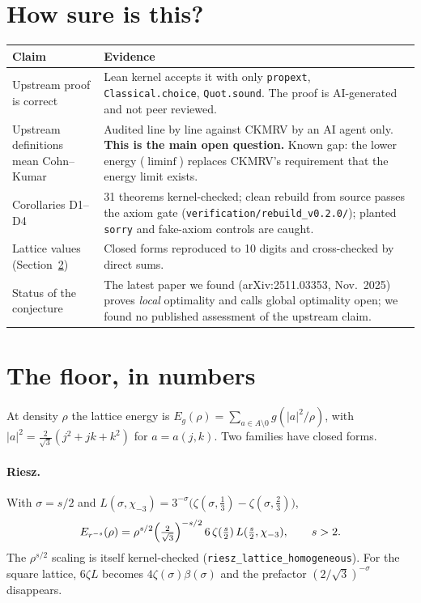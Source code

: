 \documentclass[11pt,a4paper]{article}
\newcommand{\code}[1]{\texttt{#1}}
\begin{document}
\section{How sure is this?}\label{sec:status}

\begin{center}\small
\begin{tabular}{@{}p{5.2cm}p{9.2cm}@{}}
\toprule
Claim & Evidence \\
\midrule
Upstream proof is correct & Lean kernel accepts it with only \code{propext}, \code{Classical.choice}, \code{Quot.sound}.
The proof is AI-generated and not peer reviewed. \\
Upstream definitions mean Cohn--Kumar & Audited line by line against CKMRV by an AI agent only. \textbf{This is the main open
question.} Known gap: the lower energy ($\liminf$) replaces CKMRV's requirement that the energy limit exists. \\
Corollaries D1--D4 & 31 theorems kernel-checked; clean rebuild from source passes the axiom gate
(\code{verification/rebuild\_v0.2.0/}); planted \code{sorry} and fake-axiom controls are caught. \\
Lattice values (Section~\ref{sec:values}) & Closed forms reproduced to 10 digits and cross-checked by direct sums. \\
Status of the conjecture & The latest paper we found (arXiv:2511.03353, Nov.\ 2025) proves \emph{local} optimality and calls
global optimality open; we found no published assessment of the upstream claim. \\
\bottomrule
\end{tabular}
\end{center}

\section{The floor, in numbers}\label{sec:values}

At density $\rho$ the lattice energy is $E_g(\rho)=\sum_{a\in A\setminus0} g(|a|^2/\rho)$, with
$|a|^2=\tfrac{2}{\sqrt3}(j^2+jk+k^2)$ for $a=a(j,k)$. Two families have closed forms.

\paragraph{Riesz.} With $\sigma=s/2$ and $L(\sigma,\chi_{-3})=3^{-\sigma}\bigl(\zeta(\sigma,\tfrac13)-\zeta(\sigma,\tfrac23)\bigr)$,
\begin{equation}
  E_{r^{-s}}(\rho)=\rho^{s/2}\Bigl(\tfrac{2}{\sqrt3}\Bigr)^{-s/2}\,6\,\zeta(\tfrac s2)\,L(\tfrac s2,\chi_{-3}),\qquad s>2.
\end{equation}
The $\rho^{s/2}$ scaling is itself kernel-checked (\code{riesz\_lattice\_homogeneous}). For the square lattice,
$6\zeta L$ becomes $4\zeta(\sigma)\beta(\sigma)$ and the prefactor $(2/\sqrt3)^{-\sigma}$ disappears.
\end{document}
